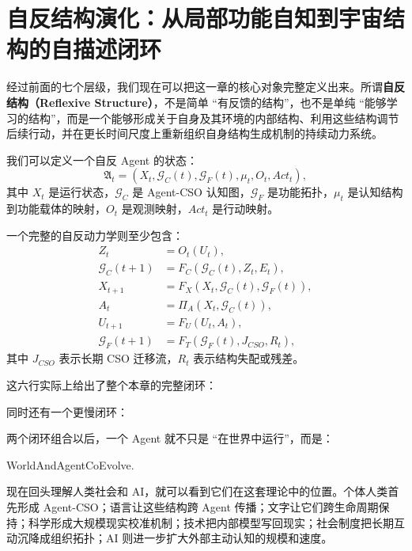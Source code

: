\section{自反结构演化：从局部功能自知到宇宙结构的自描述闭环}

经过前面的七个层级，我们现在可以把这一章的核心对象完整定义出来。所谓\textbf{自反结构（Reflexive Structure）}，不是简单 ``有反馈的结构''，也不是单纯 ``能够学习的结构''，而是一个能够形成关于自身及其环境的内部结构、利用这些结构调节后续行动，并在更长时间尺度上重新组织自身结构生成机制的持续动力系统。

我们可以定义一个自反 Agent 的状态：
\[
\mathfrak A_t
=
(
X_t,
\mathcal G_C(t),
\mathcal G_F(t),
\mu_t,
O_t,
Act_t
),
\]
其中 $X_t$ 是运行状态，$\mathcal G_C$ 是 Agent-CSO 认知图，$\mathcal G_F$ 是功能拓扑，$\mu_t$ 是认知结构到功能载体的映射，$O_t$ 是观测映射，$Act_t$ 是行动映射。

一个完整的自反动力学则至少包含：
\[
\begin{aligned}
Z_t &= O_t(U_t),\\
\mathcal G_C(t+1) &= F_C(\mathcal G_C(t),Z_t,E_t),\\
X_{t+1} &= F_X(X_t,\mathcal G_C(t),\mathcal G_F(t)),\\
A_t &= \Pi_A(X_t,\mathcal G_C(t)),\\
U_{t+1} &= F_U(U_t,A_t),\\
\mathcal G_F(t+1) &= F_T(\mathcal G_F(t),J_{CSO},R_t),
\end{aligned}
\]
其中 $J_{CSO}$ 表示长期 CSO 迁移流，$R_t$ 表示结构失配或残差。

这六行实际上给出了整个本章的完整闭环：
\begin{statementbox}
\centering
{}
\end{statementbox}
同时还有一个更慢闭环：
\begin{statementbox}
\centering
{}
\end{statementbox}

两个闭环组合以后，一个 Agent 就不只是 ``在世界中运行''，而是：
\begin{statementbox}
WorldAndAgentCoEvolve.
\end{statementbox}

现在回头理解人类社会和 AI，就可以看到它们在这套理论中的位置。个体人类首先形成 Agent-CSO；语言让这些结构跨 Agent 传播；文字让它们跨生命周期保持；科学形成大规模现实校准机制；技术把内部模型写回现实；社会制度把长期互动沉降成组织拓扑；AI 则进一步扩大外部主动认知的规模和速度。

